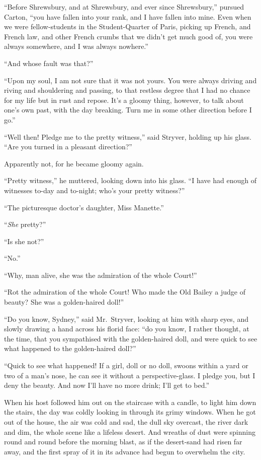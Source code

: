 ``Before Shrewsbury, and at Shrewsbury, and ever since Shrewsbury,''
pursued Carton, ``you have fallen into your rank, and I have fallen
into mine.  Even when we were fellow-students in the Student-Quarter
of Paris, picking up French, and French law, and other French crumbs
that we didn't get much good of, you were always somewhere, and I was
always nowhere.''

``And whose fault was that?''

``Upon my soul, I am not sure that it was not yours.  You were always
driving and riving and shouldering and passing, to that restless
degree that I had no chance for my life but in rust and repose.  It's
a gloomy thing, however, to talk about one's own past, with the day
breaking.  Turn me in some other direction before I go.''

``Well then!  Pledge me to the pretty witness,'' said Stryver, holding
up his glass.  ``Are you turned in a pleasant direction?''

Apparently not, for he became gloomy again.

``Pretty witness,'' he muttered, looking down into his glass.  ``I have
had enough of witnesses to-day and to-night; who's your pretty
witness?''

``The picturesque doctor's daughter, Miss Manette.''

``\emph{She} pretty?''

``Is she not?''

``No.''

``Why, man alive, she was the admiration of the whole Court!''

``Rot the admiration of the whole Court!  Who made the Old Bailey a
judge of beauty?  She was a golden-haired doll!''

``Do you know, Sydney,'' said Mr.\ Stryver, looking at him with sharp
eyes, and slowly drawing a hand across his florid face:  ``do you know,
I rather thought, at the time, that you sympathised with the
golden-haired doll, and were quick to see what happened to the
golden-haired doll?''

``Quick to see what happened!  If a girl, doll or no doll, swoons
within a yard or two of a man's nose, he can see it without a
perspective-glass.  I pledge you, but I deny the beauty.
And now I'll have no more drink; I'll get to bed.''

When his host followed him out on the staircase with a candle,
to light him down the stairs, the day was coldly looking in through
its grimy windows.  When he got out of the house, the air was cold
and sad, the dull sky overcast, the river dark and dim, the whole
scene like a lifeless desert.  And wreaths of dust were spinning
round and round before the morning blast, as if the desert-sand had
risen far away, and the first spray of it in its advance had begun to
overwhelm the city.

